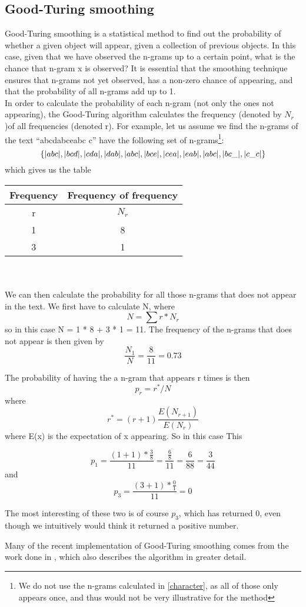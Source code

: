 \subsection{Good-Turing smoothing}
\label{Good-Turing}
Good-Turing smoothing is a statistical method to find out the probability of whether a given object will appear, given a collection of previous objects. In this case, given that we have observed the n-grams up to a certain point, what is the chance that n-gram x is observed? It is essential that the smoothing technique ensures that n-grams not yet observed, has a non-zero chance of appearing, and that the probability of all n-grams add up to 1.\\

In order to calculate the probability of each n-gram (not only the ones not appearing), the Good-Turing algorithm calculates the frequency (denoted by $N_r$)of all frequencies (denoted r). For example, let us assume we find the n-grams of the text ``abcdabceabc c'' have the following set of n-grams\footnote{We do not use the n-grams calculated in \ref{character}, as all of those only appears once, and thus would not be very illustrative for the method}:\\
$$
\{|abc|, |bcd|, |cda|, |dab|, |abc|, |bce|, |cea|, |eab|, |abc|, |bc\_|, |c\_c| \}
$$
which gives us the table\\
\begin{tabular}{|cc|}
\hline
Frequency & Frequency of frequency \\
\hline
r & $N_{r}$ \\
1 & 8\\
3 & 1\\
\hline
\end{tabular}
\\\\
We can then calculate the probability for all those n-grams that does not appear in the text. We first have to calculate N, where 
$$
N = \sum r * N_r
$$
so in this case N = 1 * 8 + 3 * 1 = 11. The frequency of the n-grams that does not appear is then given by 
$$
\frac{N_1}{N} = \frac{8}{11} = 0.73
$$

The probability of having the a n-gram that appears r times is then 
$$p_r = r^*/N$$
 where 
$$r^* = (r+1)\frac{E(N_{r+1})}{E(N_r)}$$
 where E(x) is the expectation of x appearing. So in this case This 

$$p_1 = \frac{(1 + 1) * \frac{3}{8}}{11} = \frac{\frac{6}{8}}{11} = \frac{6}{88} = \frac{3}{44}$$ and  
$$p_3 = \frac{(3 + 1) * \frac{0}{1}}{11} = 0$$

The most interesting of these two is of course $p_3$, which has returned 0, even though we intuitively would think it returned a positive number.

Many of the recent implementation of Good-Turing smoothing comes from the work done in \cite{Gale94good-turingsmoothing}, which also describes the algorithm in greater detail.

